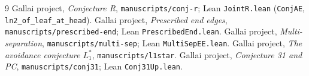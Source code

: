 \documentclass[11pt]{amsart}
\theoremstyle{definition}
\begin{document}
\begin{thebibliography}{9}
 Gallai project, \emph{Conjecture R}, \texttt{manuscripts/conj-r}; Lean
\texttt{JointR.lean} (\texttt{ConjAE}, \texttt{ln2\_of\_leaf\_at\_head}).
 Gallai project, \emph{Prescribed end edges}, \texttt{manuscripts/prescribed-end}; Lean
\texttt{PrescribedEnd.lean}.
 Gallai project, \emph{Multi-separation}, \texttt{manuscripts/multi-sep}; Lean
\texttt{MultiSepEE.lean}.
 Gallai project, \emph{The avoidance conjecture $L_1^*$}, \texttt{manuscripts/l1star}.
 Gallai project, \emph{Conjecture 31 and PC}, \texttt{manuscripts/conj31}; Lean
\texttt{Conj31Up.lean}.
\end{thebibliography}
\end{document}
